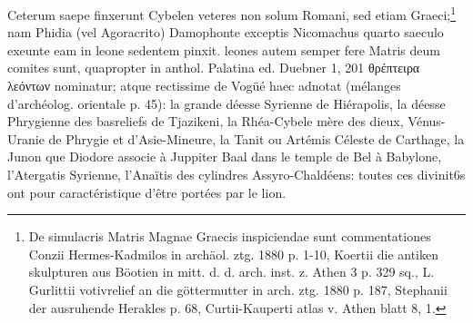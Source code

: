 \documentclass[a4paper, 11pt, oneside, polutonikogreek, german, twocolumn]{article}
\begin{document}
Ceterum saepe finxerunt Cybelen veteres non solum Romani, sed etiam Graeci;\footnote{De simulacris Matris Magnae Graecis inspiciendae sunt commentationes Conzii Hermes-Kadmilos in archäol. ztg. 1880 p. 1-10, Koertii die antiken skulpturen aus Böotien in mitt. d. d. arch. inst. z. Athen 3 p. 329 sq., L. Gurlittii votivrelief an die göttermutter in arch. ztg. 1880 p. 187, Stephanii der ausruhende Herakles p. 68, Curtii-Kauperti atlas v. Athen blatt 8, 1.} nam Phidia (vel Agoracrito) Damophonte exceptis Nicomachus quarto saeculo exeunte eam in leone sedentem pinxit. leones autem semper fere Matris deum comites sunt, quapropter in anthol. Palatina ed. Duebner 1, 201 θρέπτειρα λεόντων nominatur; atque rectissime de Vogüé haec adnotat (mélanges d'archéolog. orientale p. 45): la grande déesse Syrienne de Hiérapolis, la déesse Phrygienne des basreliefs de Tjazikeni, la Rhéa-Cybele mère des dieux, Vénus-Uranie de Phrygie et d'Asie-Mineure, la Tanit ou Artémis Céleste de Carthage, la Junon que Diodore associe à Juppiter Baal dans le temple de Bel à Babylone, l'Atergatis Syrienne, l'Anaïtis des cylindres Assyro-Chaldéens: toutes ces divinit6s ont pour caractéristique d'être portées par le lion.
\end{document}
